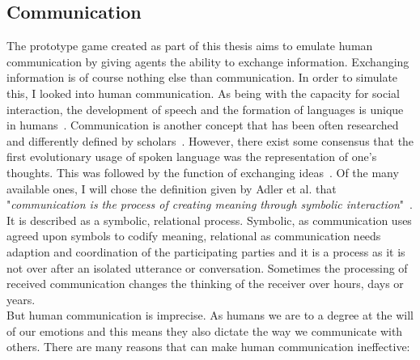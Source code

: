 \subsection{Communication}
The prototype game created as part of this thesis aims to emulate human communication by giving agents the ability to exchange information. Exchanging information is of course nothing else than communication. In order to simulate this, I looked into human communication. As being with the capacity for social interaction, the development of speech and the formation of languages is unique in humans~\cite{Levinson2006}. Communication is another concept that has been often researched and differently defined by scholars~\cite{Littlejohn2010}. However, there exist some consensus that the first evolutionary usage of spoken language was the representation of one's thoughts. This was followed by the function of exchanging ideas~\cite{Ruben1985}. Of the many available ones, I will chose the definition given by Adler et al. that "\textit{communication is the process of creating meaning through symbolic interaction}"~\cite{Adler2016}. It is described as a symbolic, relational process. Symbolic, as communication uses agreed upon symbols to codify meaning, relational as communication needs adaption and coordination of the participating parties and it is a process as it is not over after an isolated utterance or conversation. Sometimes the processing of received communication changes the thinking of the receiver over hours, days or years.~\cite{Adler2016}\\
But human communication is imprecise. As humans we are to a degree at the will of our emotions and this means they also dictate the way we communicate with others. There are many reasons that can make human communication ineffective:

